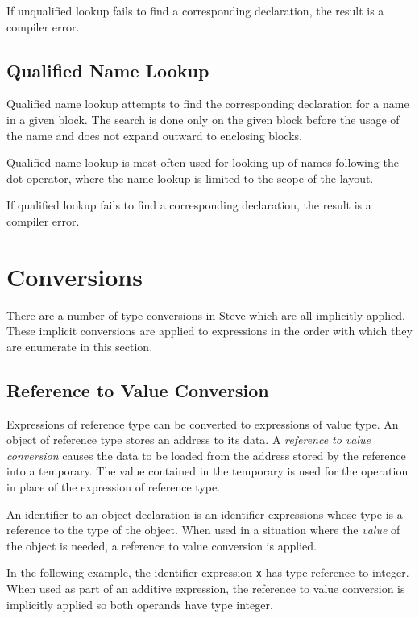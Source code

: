 If unqualified lookup fails to find a corresponding declaration, the result is a compiler error.

\subsection{Qualified Name Lookup} \label{qlfd_lookup}

Qualified name lookup attempts to find the corresponding declaration for a name in a given block. The search is done only on the given block before the usage of the name and does not expand outward to enclosing blocks.

Qualified name lookup is most often used for looking up of names following the dot-operator, where the name lookup is limited to the scope of the layout.

If qualified lookup fails to find a corresponding declaration, the result is a compiler error.

\section{Conversions} \label{conversions_guide}

There are a number of type conversions in Steve which are all implicitly applied. These implicit conversions are applied to expressions in the order with which they are enumerate in this section.

\subsection{Reference to Value Conversion} \label{reftoval_conv}

Expressions of reference type can be converted to expressions of value type. An object of reference type stores an address to its data. A \textit{reference to value conversion} causes the data to be loaded from the address stored by the reference into a temporary. The value contained in the temporary is used for the operation in place of the expression of reference type.

An identifier to an object declaration is an identifier expressions whose type is a reference to the type of the object. When used in a situation where the \textit{value} of the object is needed, a reference to value conversion is applied. 

In the following example, the identifier expression \texttt{x} has type reference to integer. When used as part of an additive expression, the reference to value conversion is implicitly applied so both operands have type integer.


